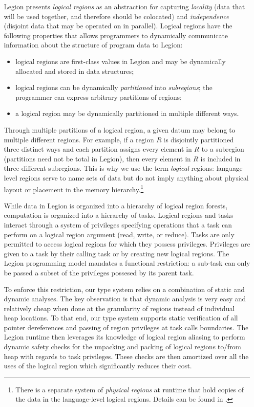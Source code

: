 Legion presents {\em logical regions} as an
abstraction for capturing {\em locality} (data that will be used together,
and therefore should be colocated) and {\em independence} (disjoint data
that may be operated on in parallel).  Logical regions have the following
properties that allows programmers to dynamically communicate information
about the structure of program data to Legion:
\begin{itemize}
\item  logical regions are first-class values in Legion
and may be dynamically allocated and stored in data structures;

\item logical regions can be dynamically {\em partitioned} into {\em subregions}; 
the programmer can express arbitrary partitions of regions;

\item  a logical region may be dynamically partitioned in multiple different ways.
\end{itemize}
Through multiple partitions
of a logical region, a given datum may belong to multiple different regions.  
For example, if a region $R$ is disjointly partitioned three distinct ways 
and each partition assigns every element in $R$ to a
subregion (partitions need not be total in Legion), then every element
in $R$ is included in three different subregions.  This is why we use
the term {\em logical} regions: language-level regions serve to name
sets of data but do not imply anything about physical layout or placement
in the memory hierarchy.\footnote{There
is a separate system of {\em physical regions} at runtime that hold
copies of the data in the language-level logical regions.  Details can
be found in \cite{Legion12}.}

While data in Legion is organized into a hierarchy of logical region forests, 
computation is organized into a hierarchy of tasks.  Logical regions and tasks interact
through a system of privileges specifying operations that a task
can perform on a logical region argument (read, write, or reduce).  
Tasks are only permitted to access logical regions for which they 
possess privileges.  Privileges are given to a task by their calling task
or by creating new logical regions.  The Legion programming model 
mandates a functional restriction: a sub-task can only be passed a subset
of the privileges possesed by its parent task.  

To enforce this restriction, our type system relies on a combination of static 
and dynamic analyses.  The key observation is that dynamic
analysis is very easy and relatively cheap when done at the granularity of
regions instead of individual heap locations.  To that end, our type system supports
static verification of all pointer dereferences and passing of region privileges at 
task calls boundaries.  The Legion runtime then leverages its knowledge of logical
region aliasing to perform dynamic safety checks for the unpacking
and packing of logical regions to/from heap with regards to task privileges.  
These checks are then amortized over all the uses of the logical region 
which significantly reduces their cost.

